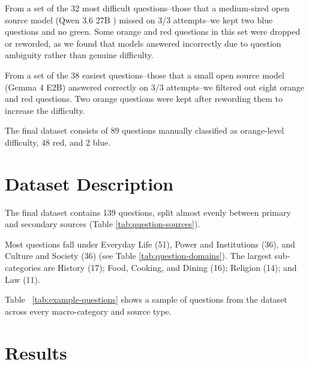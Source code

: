 \documentclass[11pt]{article}
\begin{document}
From a set of the 32 most difficult questions--those that a medium-sized open source model (Qwen 3.6 27B \cite{qwen3.6-27b}) missed on 3/3 attempts--we kept two blue questions and no green. Some orange and red questions in this set were dropped or reworded, as we found that models answered incorrectly due to question ambiguity rather than genuine difficulty.



From a set of the 38 easiest questions--those that a small open source model (Gemma 4 E2B) answered correctly on 3/3 attempts--we filtered out eight orange and red questions. Two orange questions were kept after rewording them to increase the difficulty.

The final dataset consists of 89 questions manually classified as orange-level difficulty, 48 red, and 2 blue.




\section{Dataset Description}
%
%
%

The final dataset contains 139 questions, split almost evenly between primary and secondary sources (Table \ref{tab:question-sources}).

Most questions fall under Everyday Life (51), Power and Institutions (36), and Culture and Society (36) (see Table \ref{tab:question-domains}). The largest sub-categories are History (17); Food, Cooking, and Dining (16); Religion (14); and Law (11).

Table ~\ref{tab:example-questions} shows a sample of questions from the dataset across every macro-category and source type.


\section{Results}
\end{document}

